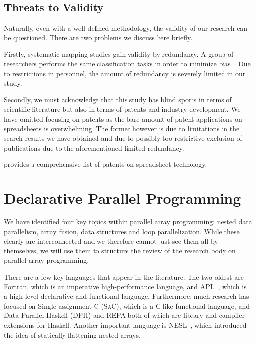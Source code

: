 \documentclass[a4paper]{article}
\newcommand{\sac}{S\textsc{a}C}
\begin{document}
\subsection{Threats to Validity}
\label{sec:threats-validity}

Naturally, even with a well defined methodology, the validity of our
research can be questioned. There are two problems we discuss here
briefly.

Firstly, systematic mapping studies gain validity by redundancy. A
group of researchers performs the same classification tasks in order
to minimize bias~\cite{keele2007guidelines}. Due to restrictions in
personnel, the amount of redundancy is severely limited in our study.

Secondly, we must acknowledge that this study has blind sports in
terms of scientific literature but also in terms of patents and
industry development. We have omitted focusing on patents as the bare
amount of patent applications on spreadsheets is overwhelming. The
former however is due to limitations in the search results we have
obtained and due to possibly too restrictive exclusion of publications
due to the aforementioned limited redundancy.

\citet{Sestoft2014Spreadsheet} provides a comprehensive list of
patents on spreadsheet technology.

\section{Declarative Parallel Programming}
\label{sec:declarative-parallel-programming}

We have identified four key topics within parallel array programming:
nested data parallelism, array fusion, data structures and loop
parallelization. While these clearly are interconnected and we
therefore cannot just see them all by themselves, we will use them to
structure the review of the research body on parallel array
programming.

There are a few key-languages that appear in the literature. The two
oldest are Fortran, which is an imperative high-performance language,
and APL~\cite{Iverson1962Programming}, which is a high-level
declarative and functional language. Furthermore, much research has
focused on Single-assignment-C (\sac{}), which is a C-like functional
language, and Data Parallel Haskell (DPH) and REPA both of which are
library and compiler extensions for Haskell. Another important
language is NESL~\cite{Blelloch1993NESL}, which introduced the idea of
statically flattening nested arrays.
\end{document}
